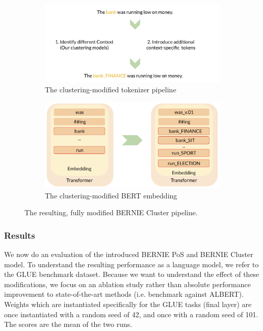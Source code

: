 \documentclass[a4paper,12pt,twoside,openright]{report}
\begin{document}
\begin{figure}
\center
\begin{subfigure}{.5\textwidth}
  \centering
  \includegraphics[width=\linewidth]{./assets/experiments/pipeline_tokenizer_BERnie_meaning.png}
  \caption{The clustering-modified tokenizer pipeline}
  \label{fig:sfig1}
\end{subfigure}%
\begin{subfigure}{.55\textwidth}
  \centering
  \includegraphics[width=\linewidth]{./assets/experiments/pipeline_model_BERnie_meaning_embedding.png}
  \caption{The clustering-modified BERT embedding}
  \label{fig:sfig2}
\end{subfigure}
\caption{The resulting, fully modified BERNIE Cluster pipeline.}
\label{fig:fig}
\end{figure}


\subsubsection{Results}

We now do an evaluation of the introduced BERNIE PoS and BERNIE Cluster model.
To understand the resulting performance as a language model, we refer to the GLUE benchmark dataset.
Because we want to understand the effect of these modifications, we focus on an ablation study rather than absolute performance improvement to state-of-the-art methods (i.e. benchmark against ALBERT).
Weights which are instantiated specifically for the GLUE tasks (final layer) are once instantiated with a random seed of 42, and once with a random seed of 101.
The scores are the mean of the two runs.
\end{document}
